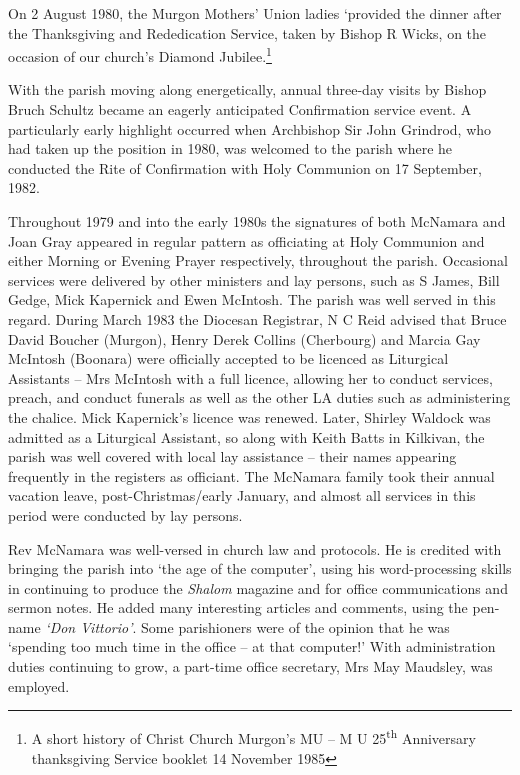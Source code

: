 On 2 August 1980, the Murgon Mothers' Union ladies `provided the dinner after the Thanksgiving and Rededication Service, taken by Bishop R Wicks, on the occasion of our church's Diamond Jubilee.\footnote{A short history of Christ Church Murgon's MU -- M U 25\textsuperscript{th} Anniversary thanksgiving Service booklet 14 November 1985}

With the parish moving along energetically, annual three-day visits by Bishop Bruch Schultz became an eagerly anticipated Confirmation service event. A particularly early highlight occurred when Archbishop Sir John Grindrod, who had taken up the position in 1980, was welcomed to the parish where he conducted the Rite of Confirmation with Holy Communion on 17 September, 1982.

Throughout 1979 and into the early 1980s the signatures of both McNamara and Joan Gray appeared in regular pattern as officiating at Holy Communion and either Morning or Evening Prayer respectively, throughout the parish. Occasional services were delivered by other ministers and lay persons, such as S James, Bill Gedge, Mick Kapernick and Ewen McIntosh. The parish was well served in this regard. During March 1983 the Diocesan Registrar, N C Reid advised that Bruce David Boucher (Murgon), Henry Derek Collins (Cherbourg) and Marcia Gay McIntosh (Boonara) were officially accepted to be licenced as Liturgical Assistants -- Mrs McIntosh with a full licence, allowing her to conduct services, preach, and conduct funerals as well as the other LA duties such as administering the chalice. Mick Kapernick's licence was renewed. Later, Shirley Waldock was admitted as a Liturgical Assistant, so along with Keith Batts in Kilkivan, the parish was well covered with local lay assistance -- their names appearing frequently in the registers as officiant. The McNamara family took their annual vacation leave, post-Christmas/early January, and almost all services in this period were conducted by lay persons.

Rev McNamara was well-versed in church law and protocols. He is credited with bringing the parish into `the age of the computer', using his word-processing skills in continuing to produce the \emph{Shalom} magazine and for office communications and sermon notes. He added many interesting articles and comments, using the pen-name \emph{`Don Vittorio'}. Some parishioners were of the opinion that he was `spending too much time in the office -- at that computer!' With administration duties continuing to grow, a part-time office secretary, Mrs May Maudsley, was employed.

